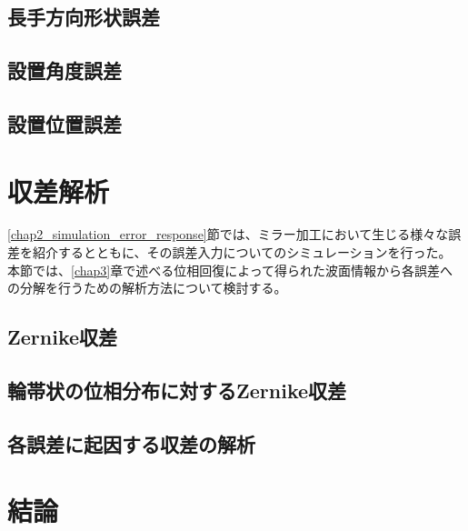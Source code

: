 \subsection{長手方向形状誤差}

\subsection{設置角度誤差}

\subsection{設置位置誤差}


\clearpage
\newpage


\clearpage
\newpage
\section{収差解析}
\label{chap2_simulation_zernike_analysis}

\ref{chap2_simulation_error_response}節では、ミラー加工において生じる様々な誤差を紹介するとともに、その誤差入力についてのシミュレーションを行った。
本節では、\ref{chap3}章で述べる位相回復によって得られた波面情報から各誤差への分解を行うための解析方法について検討する。

\subsection{Zernike収差}

\subsection{輪帯状の位相分布に対するZernike収差}


\subsection{各誤差に起因する収差の解析}



\section{結論}
\label{chap2_conclusion}



